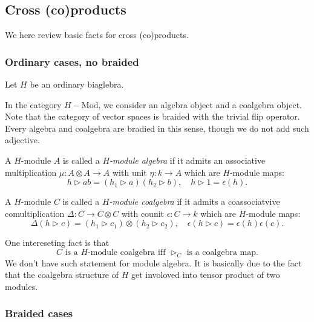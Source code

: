 
\subsection*{Cross (co)products}

We here review basic facts for cross (co)products.

\subsubsection*{Ordinary cases, no braided}

Let $H$ be an ordinary biaglebra.

In the category $H-\mathrm{Mod}$, we consider an algebra object and a coalgebra object.
Note that the category of vector spaces is braided with the trivial flip operator.
Every algebra and coalgebra are bradied in this sense, though we do not add such adjective.

\begin{definition}
    A $H$-module $A$ is called a \emph{$H$-module algebra} if it admits an associative multiplication $\mu: A \otimes A \rightarrow A$ with unit $\eta: k \rightarrow A$ which are $H$-module maps:
    \[
    h \triangleright ab = (h_1 \triangleright a) (h_2 \triangleright b), \quad h \triangleright 1 = \epsilon(h).
    \]
\end{definition}

\begin{definition}
    A $H$-module $C$ is called a \emph{$H$-module coalgebra} if it admits a coassociatvive comultiplication $\Delta: C \rightarrow C \otimes C$ with counit $\epsilon: C \rightarrow k$ which are $H$-module maps:
    \[
    \Delta(h \triangleright c) = (h_1 \triangleright c_1) \otimes (h_2 \triangleright c_2), \quad \epsilon(h \triangleright c) = \epsilon(h) \epsilon(c).
    \]
\end{definition}

One intereseting fact is that
\[
C \text{ is a } H \text{-module coalgebra iff } \triangleright_C \text{ is a coalgebra map.}
\]
We don't have such statement for module algebra.
It is basically due to the fact that the coalgebra structure of $H$ get involoved into tensor product of two modules.


\subsubsection*{Braided cases}